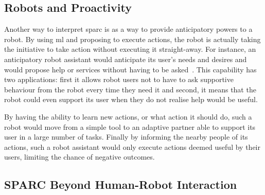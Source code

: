 

\subsection{Robots and Proactivity}
Another way to interpret \gls{sparc} is as a way to provide anticipatory powers to a robot. By using \gls{ml} and proposing to execute actions, the robot is actually taking the initiative to take action without executing it straight-away. For instance, an anticipatory robot assistant would anticipate its user's needs and desires and would propose help or services without having to be asked~\citep{mason2011robot}. This capability has two applications: first it allows robot users not to have to ask supportive behaviour from the robot every time they need it and second, it means that the robot could even support its user when they do not realise help would be useful.

By having the ability to learn new actions, or what action it should do, such a robot would move from a simple tool to an adaptive partner able to support its user in a large number of tasks. Finally by informing the nearby people of its actions, such a robot assistant would only execute actions deemed useful by their users, limiting the chance of negative outcomes.

\subsection{SPARC Beyond Human-Robot Interaction}\label{sec:disc_beyond}

